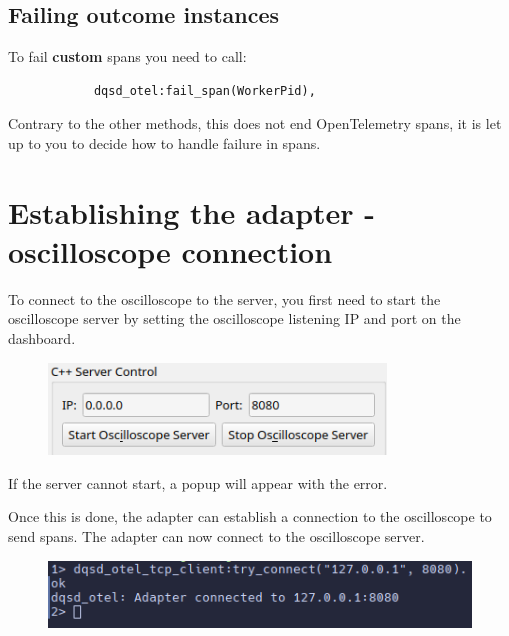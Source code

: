    \subsection{Failing outcome instances}
        To fail \textbf{custom} spans you need to call:
        \begin{verbatim}
            dqsd_otel:fail_span(WorkerPid),
        \end{verbatim}
        Contrary to the other methods, this does not end OpenTelemetry spans, it is let up to you to decide how to handle failure in spans.

\section{Establishing the adapter - oscilloscope connection}
    To connect to the oscilloscope to the server, you first need to start the oscilloscope server by setting the oscilloscope listening IP and port on the dashboard.

    \begin{figure}[H]
        \begin{center}
        \includegraphics[width = 0.8\textwidth]{img/manual/cserv.png}
        \end{center}
    \end{figure}

    If the server cannot start, a popup will appear with the error.
    
    Once this is done, the adapter can establish a connection to the oscilloscope to send spans. The adapter can now connect to the oscilloscope server. 
    
    \begin{figure}[H]
        \begin{center}
        \includegraphics[width = 0.8 \textwidth]{img/manual/connectadapter.png}
        \end{center}
    \end{figure}
    

